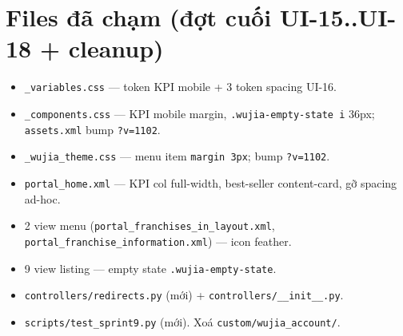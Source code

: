 \section{Files đã chạm (đợt cuối UI-15..UI-18 + cleanup)}

\begin{itemize}[leftmargin=*]
    \item \texttt{\_variables.css} --- token KPI mobile + 3 token spacing UI-16.
    \item \texttt{\_components.css} --- KPI mobile margin, \texttt{.wujia-empty-state i}
          36px; \texttt{assets.xml} bump \texttt{?v=1102}.
    \item \texttt{\_wujia\_theme.css} --- menu item \texttt{margin 3px}; bump \texttt{?v=1102}.
    \item \texttt{portal\_home.xml} --- KPI col full-width, best-seller content-card,
          gỡ spacing ad-hoc.
    \item 2 view menu (\texttt{portal\_franchises\_in\_layout.xml},
          \texttt{portal\_franchise\_information.xml}) --- icon feather.
    \item 9 view listing --- empty state \texttt{.wujia-empty-state}.
    \item \texttt{controllers/redirects.py} (mới) + \texttt{controllers/\_\_init\_\_.py}.
    \item \texttt{scripts/test\_sprint9.py} (mới). Xoá \texttt{custom/wujia\_account/}.
\end{itemize}
